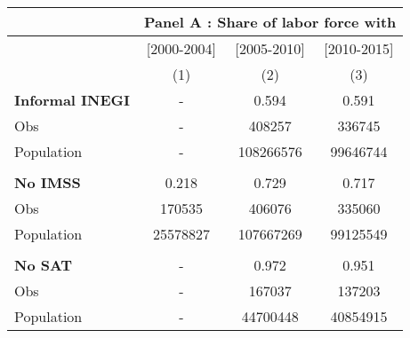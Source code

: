 \begin{tabular}{lccc}
\toprule
      & \multicolumn{3}{c}{Panel A : Share of labor force with} \\
\midrule
      & [2000-2004] & [2005-2010] & [2010-2015] \\
\midrule
      & (1)   & (2)   & (3) \\
\midrule
\midrule
\textbf{Informal INEGI} & -     & 0.594 & 0.591 \\
Obs   & -     & 408257 & 336745 \\
Population & -     & 108266576 & 99646744 \\
      &       &       &  \\
\textbf{No IMSS} & 0.218 & 0.729 & 0.717 \\
Obs   & 170535 & 406076 & 335060 \\
Population & 25578827 & 107667269 & 99125549 \\
      &       &       &  \\
\textbf{No SAT} & -     & 0.972 & 0.951 \\
Obs   & -     & 167037 & 137203 \\
Population & -     & 44700448 & 40854915 \\
\bottomrule
\bottomrule
\end{tabular}%
